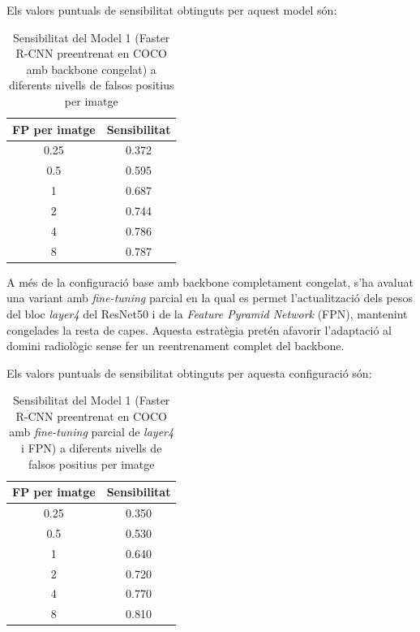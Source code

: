 \documentclass[conference]{IEEEtran}
\begin{document}
Els valors puntuals de sensibilitat obtinguts per aquest model són:

\begin{table}[H]
\centering
\footnotesize
\caption{Sensibilitat del Model 1 (Faster R-CNN preentrenat en COCO amb backbone congelat) a diferents nivells de falsos positius per imatge}
\label{tab:model1_coco_frozen_sensitivity}
\setlength{\tabcolsep}{6pt}
\begin{tabular}{cc}
\toprule
\textbf{FP per imatge} & \textbf{Sensibilitat} \\
\midrule
0.25 & 0.372 \\
0.5  & 0.595 \\
1    & 0.687 \\
2    & 0.744 \\
4    & 0.786 \\
8    & 0.787 \\
\bottomrule
\end{tabular}
\end{table}



A més de la configuració base amb backbone completament congelat, s’ha avaluat una
variant amb \textit{fine-tuning} parcial en la qual es permet l’actualització dels pesos
del bloc \textit{layer4} del ResNet50 i de la \textit{Feature Pyramid Network} (FPN),
mantenint congelades la resta de capes. Aquesta estratègia pretén afavorir l’adaptació
al domini radiològic sense fer un reentrenament complet del backbone.

Els valors puntuals de sensibilitat obtinguts per aquesta configuració són:

\begin{table}[H]
\centering
\footnotesize
\caption{Sensibilitat del Model 1 (Faster R-CNN preentrenat en COCO amb \textit{fine-tuning} parcial de \textit{layer4} i FPN) a diferents nivells de falsos positius per imatge}
\label{tab:model1_coco_unfrozen_sensitivity}
\setlength{\tabcolsep}{6pt}
\begin{tabular}{cc}
\toprule
\textbf{FP per imatge} & \textbf{Sensibilitat} \\
\midrule
0.25 & 0.350 \\
0.5  & 0.530 \\
1    & 0.640 \\
2    & 0.720 \\
4    & 0.770 \\
8    & 0.810 \\
\bottomrule
\end{tabular}
\end{table}
\end{document}
